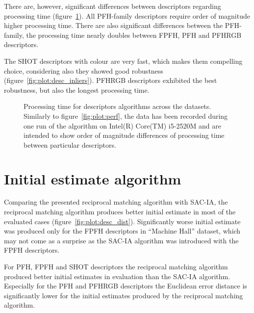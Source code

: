 There are, however, significant differences between descriptors regarding processing time (figure~\ref{fig:plot:desc_perf}). All \gls{PFH}-family descriptors require order of magnitude higher processing time. There are also significant differences between the \gls{PFH}-family, the processing time nearly doubles between \gls{FPFH}, \gls{PFH} and \gls{PFHRGB} descriptors.

The \gls{SHOT} descriptors with colour are very fast, which makes them compelling choice, considering also they showed good robustness (figure~\ref{fig:plot:desc_inliers}). \gls{PFHRGB} descriptors exhibited the best robustness, but also the longest processing time.

\begin{figure}
  \centering
  
  \caption{Processing time for descriptors algorithms across the datasets. Similarly to figure~\ref{fig:plot:perf}, the data has been recorded during one run of the algorithm on Intel(R) Core(TM) i5-2520M and are intended to show order of magnitude differences of processing time between particular descriptors.}
  \label{fig:plot:desc_perf}
\end{figure}

\section{Initial estimate algorithm}

Comparing the presented reciprocal matching algorithm with \gls{SAC-IA}, the reciprocal matching algorithm produces better initial estimate in most of the evaluated cases (figure~\ref{fig:plot:desc_dist}). Significantly worse initial estimate was produced only for the \gls{FPFH} descriptors in ``Machine Hall'' dataset, which may not come as a surprise as the \gls{SAC-IA} algorithm was introduced with the \gls{FPFH} descriptors.

For \gls{PFH}, \gls{FPFH} and \gls{SHOT} descriptors the reciprocal matching algorithm produced better initial estimates in evaluation than the \gls{SAC-IA} algorithm. Especially for the \gls{PFH} and \gls{PFHRGB} descriptors the Euclidean error distance is significantly lower for the initial estimates produced by the reciprocal matching algorithm.
